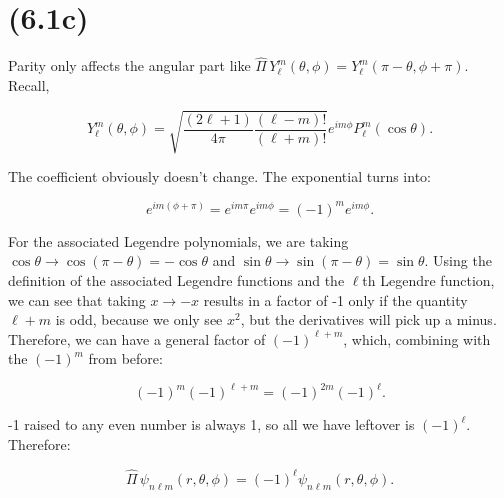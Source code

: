 \section{(6.1c)}

Parity only affects the angular part like $\hat{\Pi} \, Y^m_\ell(\theta,\phi) = Y^m_\ell(\pi - \theta, \phi + \pi).$ Recall,

\begin{equation}
  Y^m_\ell(\theta,\phi) = \sqrt{\frac{(2\ell + 1)}{4\pi} \frac{(\ell - m)!}{(\ell + m)!}} e^{im\phi} P^m_\ell(\cos\theta).
\end{equation}

The coefficient obviously doesn't change. The exponential turns into:

\begin{equation}
  e^{im(\phi+\pi)} = e^{im\pi}e^{im\phi} = (-1)^m e^{im\phi}.
\end{equation}

For the associated Legendre polynomials, we are taking $\cos\theta \rightarrow \cos(\pi - \theta) = -\cos\theta$ and $\sin\theta \rightarrow \sin(\pi - \theta) = \sin\theta$. Using the definition of the associated Legendre functions and the $\ell$th Legendre function, we can see that taking $x \rightarrow -x$ results in a factor of -1 only if the quantity $\ell+m$ is odd, because we only see $x^2$, but the derivatives will pick up a minus. Therefore, we can have a general factor of $(-1)^{\ell+m}$, which, combining with the $(-1)^m$ from before:

\begin{equation}
  (-1)^m(-1)^{\ell + m} = (-1)^{2m}(-1)^\ell.
\end{equation}

-1 raised to any even number is always 1, so all we have leftover is $(-1)^\ell$. Therefore:

\begin{equation}
  \boxed{\hat{\Pi} \, \psi_{n\ell m}(r,\theta,\phi) = (-1)^\ell \psi_{n\ell m}(r,\theta,\phi).}
\end{equation}




